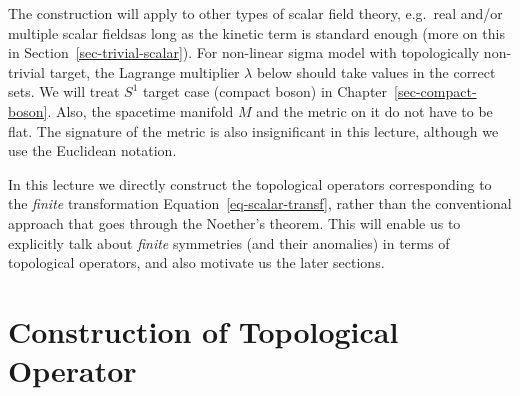 \documentclass[
  letterpaper,
  DIV=11,
  numbers=noendperiod]{scrreport}
\begin{document}
\begin{tcolorbox}[enhanced jigsaw, colframe=quarto-callout-note-color-frame, leftrule=.75mm, bottomrule=.15mm, breakable, toptitle=1mm, toprule=.15mm, coltitle=black, opacityback=0, opacitybacktitle=0.6, titlerule=0mm, colbacktitle=quarto-callout-note-color!10!white, colback=white, bottomtitle=1mm, title=\textcolor{quarto-callout-note-color}{\faInfo}\hspace{0.5em}{\textsf{Note}}, rightrule=.15mm, arc=.35mm, left=2mm]

The construction will apply to other types of scalar field theory,
e.g.~real and/or multiple scalar fieldsas long as the kinetic term is
standard enough (more on this in Section~\ref{sec-trivial-scalar}). For
non-linear sigma model with topologically non-trivial target, the
Lagrange multiplier \(\lambda\) below should take values in the correct
sets. We will treat \(S^1\) target case (compact boson) in
Chapter~\ref{sec-compact-boson}. Also, the spacetime manifold \(M\) and
the metric on it do not have to be flat. The signature of the metric is
also insignificant in this lecture, although we use the Euclidean
notation.

\end{tcolorbox}

\begin{tcolorbox}[enhanced jigsaw, colframe=quarto-callout-note-color-frame, leftrule=.75mm, bottomrule=.15mm, breakable, toptitle=1mm, toprule=.15mm, coltitle=black, opacityback=0, opacitybacktitle=0.6, titlerule=0mm, colbacktitle=quarto-callout-note-color!10!white, colback=white, bottomtitle=1mm, title=\textcolor{quarto-callout-note-color}{\faInfo}\hspace{0.5em}{\textsf{Note}}, rightrule=.15mm, arc=.35mm, left=2mm]

In this lecture we directly construct the topological operators
corresponding to the \emph{finite} transformation
Equation~\ref{eq-scalar-transf}, rather than the conventional approach
that goes through the Noether's theorem. This will enable us to
explicitly talk about \emph{finite} symmetries (and their anomalies) in
terms of topological operators, and also motivate us the later sections.

\end{tcolorbox}

\hypertarget{construction-of-topological-operator}{%
\section{Construction of Topological
Operator}\label{construction-of-topological-operator}}
\end{document}
